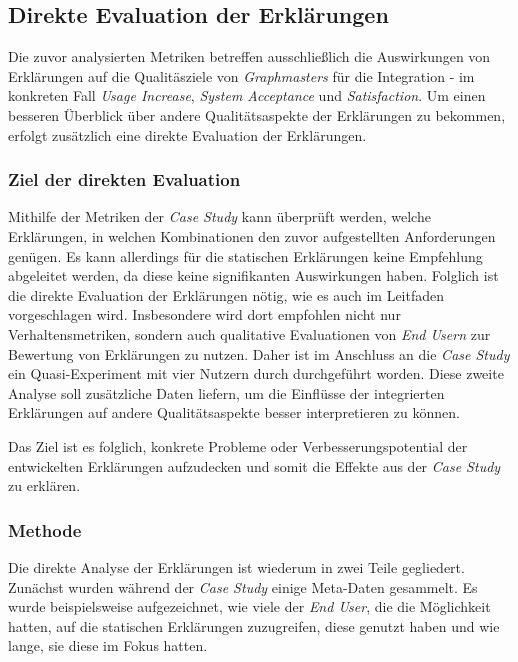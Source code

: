\subsection{Direkte Evaluation der Erklärungen}
\label{sec:study_results_qualitativ}

Die zuvor analysierten Metriken betreffen ausschließlich die Auswirkungen von Erklärungen auf die Qualitäsziele von \textit{Graphmasters} für die Integration - im konkreten Fall \textit{Usage Increase}, \textit{System Acceptance} und \textit{Satisfaction}. Um einen besseren Überblick über andere Qualitätsaspekte der Erklärungen zu bekommen, erfolgt zusätzlich eine direkte Evaluation der Erklärungen.

\subsubsection{Ziel der direkten Evaluation}

Mithilfe der Metriken der \textit{Case Study} kann überprüft werden, welche Erklärungen, in welchen Kombinationen den zuvor aufgestellten Anforderungen genügen. Es kann allerdings für die statischen Erklärungen keine Empfehlung abgeleitet werden, da diese keine signifikanten Auswirkungen haben. Folglich ist die direkte Evaluation der Erklärungen nötig, wie es auch im Leitfaden vorgeschlagen wird. Insbesondere wird dort empfohlen nicht nur Verhaltensmetriken, sondern auch qualitative Evaluationen von \textit{End Usern} zur Bewertung von Erklärungen zu nutzen. Daher ist im Anschluss an die \textit{Case Study} ein Quasi-Experiment mit vier Nutzern durch durchgeführt worden. Diese zweite Analyse soll zusätzliche Daten liefern, um die Einflüsse der integrierten Erklärungen auf andere Qualitätsaspekte besser interpretieren zu können.

Das Ziel ist es folglich, konkrete Probleme oder Verbesserungspotential der entwickelten Erklärungen aufzudecken und somit die Effekte aus der \textit{Case Study} zu erklären.

\subsubsection{Methode}

Die direkte Analyse der Erklärungen ist wiederum in zwei Teile gegliedert. Zunächst wurden während der \textit{Case Study} einige Meta-Daten gesammelt. Es wurde beispielsweise aufgezeichnet, wie viele der \textit{End User}, die die Möglichkeit hatten, auf die statischen Erklärungen zuzugreifen, diese genutzt haben und wie lange, sie diese im Fokus hatten.

